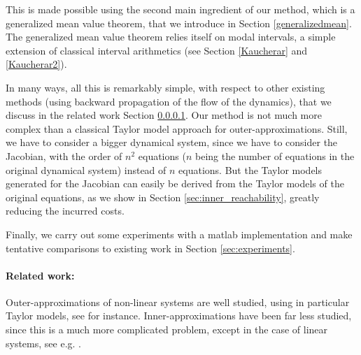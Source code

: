 \documentclass{sig-alternate-05-2015} %
\begin{document}
This is made possible using the second main ingredient of our method, which is 
a generalized mean value theorem, that we introduce in Section \ref{generalizedmean}. 
The generalized mean value theorem relies itself on modal intervals, a simple 
extension of classical interval arithmetics (see Section \ref{Kaucherar} and \ref{Kaucherar2}). 

In many ways, all this is remarkably simple, with respect to other existing methods (using backward propagation
of the flow of the dynamics), that we discuss in the related work Section \ref{relatedwork}. Our method
is not much more complex than a classical Taylor model approach for outer-approximations. 
Still, we have to consider a bigger dynamical system, since we have to consider the Jacobian,
with the order of $n^2$ equations ($n$ being the number of equations in the original dynamical
system) instead of $n$ equations. But the Taylor models generated for the Jacobian can easily be derived from
the Taylor models of the original equations, as we show in Section \ref{sec:inner_reachability},
greatly reducing the incurred costs.  

Finally, we carry out some 
experiments with a matlab implementation and make tentative comparisons to existing work in Section \ref{sec:experiments}. 




\paragraph{Related work:}
\label{relatedwork}

Outer-approximations of non-linear systems are well studied, using in particular Taylor
models, see \cite{Taylor07} for instance. Inner-approximations have been far less studied, 
since this is a much more complicated problem, except in the case of linear systems, 
see e.g. \cite{LeGuernic09,GirardLinear06}.
\end{document}
